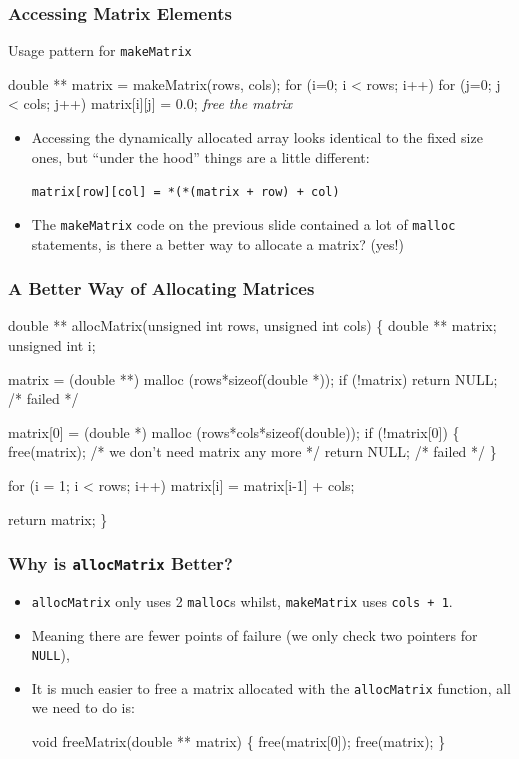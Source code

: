 \documentclass[table]{beamer}
\newif\ifschigh\schighfalse
\newcommand{\kw}[1]{\ifschigh\textcolor{red}{#1}\else\textcolor{keyword}{#1}\fi}
\newcommand{\kc}[1]{\ifschigh\textcolor{red}{#1}\else\textcolor{comment}{#1}\fi}
\newcounter{sckll}
\newcommand{\kr}{\setcounter{sckll}{1}}
\newcommand{\kl}{}
\begin{document}
\begin{frame}[fragile]
\frametitle{Accessing Matrix Elements}
\begin{block}{Usage pattern for {\tt makeMatrix}}
\begin{semiverbatim}
\kw{double} ** matrix = makeMatrix(rows, cols);
\kw{for} (i=0; i < rows; i++)
   \kw{for} (j=0; j < cols; j++)
      matrix[i][j] = 0.0;
\emph{free the matrix}      
\end{semiverbatim}
\end{block}
\begin{itemize}
\item Accessing the dynamically allocated array looks identical to the fixed size ones, but ``under the hood'' things are a little different:
\begin{alertblock}{}
\begin{center}
\tt matrix[row][col] = *(*(matrix + row) + col)
\end{center}
\end{alertblock}
\item The {\tt makeMatrix} code on the previous slide contained a lot of {\tt malloc} statements, is there a better way to allocate a matrix? (yes!)
\end{itemize}
\end{frame}

{
\begin{frame}[fragile]
\frametitle{A Better Way of Allocating Matrices}
\begin{semiverbatim}
\scriptsize
\kr\kl\kw{double} ** allocMatrix(\kw{unsigned int} rows, \kw{unsigned int} cols)
\kl\{
\kl   \kw{double} ** matrix;
\kl   \kw{unsigned int} i;
\kl
\kl   matrix = (\kw{double} **) malloc (rows*sizeof(\kw{double} *));
\kl   \kw{if} (!matrix) \kw{return} NULL; \kc{/* failed */}
\kl
\kl   matrix[0] = (\kw{double} *) malloc (rows*cols*\kw{sizeof}(\kw{double}));
\kl   \kw{if} (!matrix[0])
\kl   \{
\kl      free(matrix); \kc{/* we don't need matrix any more */}
\kl      \kw{return} NULL;  \kc{/* failed */}
\kl   \}
\kl
\kl   \kw{for} (i = 1; i < rows; i++)
\kl      matrix[i] = matrix[i-1] + cols;
\kl
\kl   \kw{return} matrix;
\kl\}
\end{semiverbatim}
\end{frame}
}

\begin{frame}[fragile]
\frametitle{Why is {\tt allocMatrix} Better?}
\begin{itemize}
\item {\tt allocMatrix} only uses 2 {\tt malloc}s whilst, {\tt makeMatrix} uses {\tt cols + 1}.
\item Meaning there are fewer points of failure (we only check two pointers for {\tt NULL}),
\item It is much easier to free a matrix allocated with the {\tt allocMatrix} function, all we need to do is:
\begin{semiverbatim}
\kw{void} freeMatrix(\kw{double} ** matrix)
\{
   free(matrix[0]);
   free(matrix);
\}
\end{semiverbatim}
\end{itemize}
\end{frame}
\end{document}
